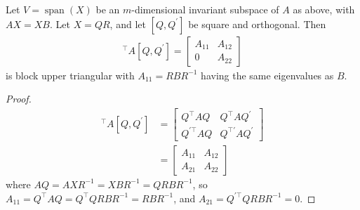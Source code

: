 \documentclass[11pt]{article}
\numberwithin{equation}{section}
\begin{document}
\begin{lemma}
    Let $V = \operatorname{span}(X)$ be an $m$-dimensional invariant subspace of $A$ as above, with $AX=XB$. Let $X = QR$, and let $[Q,Q^\prime]$ be square and orthogonal. 
    Then \begin{align*}
        [Q,Q^\prime]^\top A [Q,Q^\prime] = \left[\begin{array}{ll}
            A_{11} & A_{12} \\
            0 & A_{22}
            \end{array}\right]
    \end{align*}
    is block upper triangular with $A_{11} = R B R^{-1}$ having the same eigenvalues as $B$.
    \begin{proof}
        \begin{align*}
            [Q,Q^\prime]^\top A [Q,Q^\prime] &= \left[\begin{array}{ll}
                Q^{\top} A Q & Q^{\top} A Q^{\prime} \\
                Q^{\prime \top} A Q & Q^{\top \prime} A Q^{\prime}
                \end{array}\right] \\
            &= \left[\begin{array}{ll}
                A_{11} & A_{12} \\
                A_{21} & A_{22}
                \end{array}\right]
        \end{align*}
        where $A Q = A X R^{-1} = X B R^{-1} = Q RBR^{-1}$, so $A_{11} = Q^{\top} A Q = Q^{\top}  Q R B R^{-1} = R B R^{-1}$, and $A_{21} = Q^{\prime \top} Q R B R^{-1} = 0$.
    \end{proof}
\end{lemma}
\end{document}
